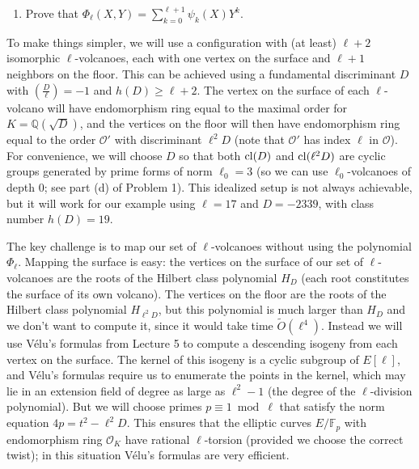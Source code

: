 \documentclass[11pt]{article}
\newcommand{\Fp}{\mathbb{F}_p}
\newcommand{\Q}{\mathbb{Q}}
\newcommand{\softO}{\widetilde{O}}
\renewcommand{\O}{\mathcal{O}}
\newcommand{\cl}{{\rm cl}}
\theoremstyle{definition}
\begin{document}
\begin{enumerate}[{\bf (a)}]
\item Prove that $\Phi_\ell(X,Y)=\sum_{k=0}^{\ell+1}\psi_k(X)Y^k$.
\end{enumerate}

To make things simpler, we will use a configuration with (at least) $\ell+2$ isomorphic $\ell$-volcanoes, each with one vertex on the surface and $\ell+1$ neighbors on the floor.
This can be achieved using a fundamental discriminant $D$ with $(\frac{D}{\ell})=-1$ and $h(D)\ge \ell+2$.
The vertex on the surface of each $\ell$-volcano will have endomorphism ring equal to the maximal order for $K=\Q(\sqrt{D})$, and the vertices on the floor will then have endomorphism ring equal to the order $\O'$ with discriminant $\ell^2D$ (note that $\O'$ has index $\ell$ in $\O$).  For convenience, we will choose $D$ so that both $\cl(D)$ and $\cl(\ell^2D)$ are cyclic groups generated by prime forms of norm $\ell_0=3$ (so we can use $\ell_0$-volcanoes of depth 0; see part (d) of Problem 1).  This idealized setup is not always achievable, but it will work for our example using $\ell=17$ and $D=-2339$, with class number $h(D)=19$.

The key challenge is to map our set of $\ell$-volcanoes without using the polynomial $\Phi_\ell$.
Mapping the surface is easy: the vertices on the surface of our set of $\ell$-volcanoes are the roots of the Hilbert class polynomial $H_D$ (each root constitutes the surface of its own volcano).
The vertices on the floor are the roots of the Hilbert class polynomial $H_{\ell^2D}$, but this polynomial is much larger than $H_D$ and we don't want to compute it, since it would take time $\softO(\ell^4)$.
Instead we will use V\'{e}lu's formulas from Lecture 5 to compute a descending isogeny from each vertex on the surface.
The kernel of this isogeny is a cyclic subgroup of $E[\ell]$, and V\'{e}lu's formulas require us to enumerate the points in the kernel, which may lie in an extension field of degree as large as $\ell^2-1$ (the degree of the $\ell$-division polynomial).
But we will choose primes $p\equiv 1\bmod \ell$ that satisfy the norm equation $4p=t^2-\ell^2D$.  This ensures that the elliptic curves $E/\Fp$ with endomorphism ring $\O_K$ have rational $\ell$-torsion (provided we choose the correct twist); in this situation V\'{e}lu's formulas are very efficient.
\end{document}
